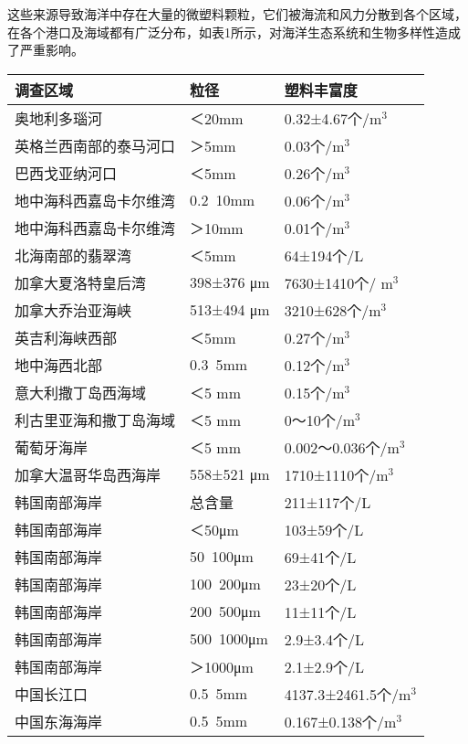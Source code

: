 \documentclass{article}
\begin{document}
    这些来源导致海洋中存在大量的微塑料颗粒，它们被海流和风力分散到各个区域，在各个港口及海域都有广泛分布，如表1所示，对海洋生态系统和生物多样性造成了严重影响。


        \begin{center} 
        \begin{tabular}{p{5cm} p{3cm} p{3.2cm}}
    	   \hline
    	   调查区域 & 粒径 & 塑料丰富度\\
    	   \hline
    	   奥地利多瑙河&＜20mm & 0.32±4.67个/m$^{3}$\\
    	   英格兰西南部的泰马河口 & ＞5mm & 0.03个/m$^{3}$\\
    	   巴西戈亚纳河口 & ＜5mm& 0.26个/m$^{3}$\\
    	   地中海科西嘉岛卡尔维湾 &0.2~10mm &0.06个/m$^{3}$\\
    	   地中海科西嘉岛卡尔维湾 & ＞10mm & 0.01个/m$^{3}$\\
    	   北海南部的翡翠湾 & ＜5mm& 64±194个/L\\
    	   加拿大夏洛特皇后湾 &  398±376 μm &7630±1410个/ m$^{3}$\\
    	   加拿大乔治亚海峡 & 513±494 μm &3210±628个/m$^{3}$\\
    	   英吉利海峡西部&＜5mm&0.27个/m$^{3}$\\
    	   地中海西北部&0.3~5mm &0.12个/m$^{3}$\\
    	   意大利撒丁岛西海域&＜5 mm&0.15个/m$^{3}$\\
    	   利古里亚海和撒丁岛海域&＜5 mm&0～10个/m$^{3}$\\
    	   葡萄牙海岸&＜5 mm&0.002～0.036个/m$^{3}$\\
    	   加拿大温哥华岛西海岸&558±521 μm&1710±1110个/m$^{3}$\\
    	   韩国南部海岸& 总含量 & 211±117个/L\\
    	   韩国南部海岸&＜50μm&103±59个/L\\
    	   韩国南部海岸&50~100μm&69±41个/L\\
    	   韩国南部海岸&100~200μm&23±20个/L\\
    	   韩国南部海岸&200~500μm&11±11个/L\\
    	   韩国南部海岸&500~1000μm&2.9±3.4个/L\\
    	   韩国南部海岸&＞1000μm&2.1±2.9个/L\\
    	   中国长江口&0.5~5mm&4137.3±2461.5个/m$^{3}$\\
    	   中国东海海岸&0.5~5mm&0.167±0.138个/m$^{3}$\\
    	   \hline
        \end{tabular}
      \end{center}  
        
\end{document}
